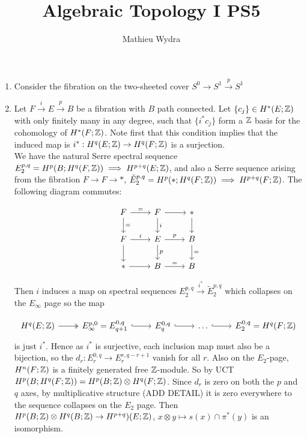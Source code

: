 \documentclass[10pt,a4paper]{article}
\title{Algebraic Topology I PS5}
\author{Mathieu Wydra}
\date{}
\begin{document}
\maketitle
\begin{enumerate}
\item Consider the fibration on the two-sheeted cover $S^0\to S^1\xrightarrow{p} S^1$
\item Let $F\xrightarrow{i }E \xrightarrow{p} B$ be a fibration with $B$ path connected. Let $\{c_j\}\in H^*(E;\mathbb{Z})$ with only finitely many in any degree, such that $\{i^*c_j\}$ form a $\mathbb{Z}$ basis for the cohomology of $H^*(F;\mathbb{Z})$. Note first that this condition implies that the induced map is $i^*:H^q(E;\mathbb{Z})\to H^q(F;\mathbb{Z})$ is a surjection. \\
We have the natural Serre spectral sequence $E^{p,q}_2 = H^p(B;H^q(F,\mathbb{Z}))\implies H^{p+q}(E;\mathbb{Z})$, and also a Serre sequence arising from the fibration $F\to F\to *$, $\tilde{E}^{p,q}_2 = H^p(*; H^q(F;\mathbb{Z}))\implies H^{p+q}(F;\mathbb{Z})$. The following diagram commutes:

\[\begin{tikzcd}
F \arrow[r,"="] \arrow[d,"="] & F\arrow{r}\arrow[d,"i"] & * \arrow{d}\\
F\arrow[r,"i"]\arrow{d} & E\arrow[r,"p"]\arrow[d,"p"]& B\arrow[d,"="]\\
* \arrow{r} & B\arrow[r,"="] & B
\end{tikzcd}\]

Then $i$ induces a map on spectral sequences $E_2^{p,q}\xrightarrow{i^*}\tilde{E}_2^{p,q}$ which collapses on the $E_\infty$ page so the map

\[\begin	{tikzcd}
H^q(E;\Z) \arrow[r,two heads] &E^{p,0}_\infty  = E^{0,q}_{q+1} \arrow[r,hook]& E^{0,q}_q\arrow[r,hook] &\ldots\arrow[r,hook]& E_2^{0,q} = H^q(F;\Z)
\end{tikzcd}\]
is just $i^*$. Hence as $i^*$ is surjective, each inclusion map must also be a bijection, so the $d_r:E^{0,q}_r\to E^{r,q-r+1}_r$ vanish for all $r$. Also on the $E_2$-page, $H^n(F;\mathbb{Z})$ is a finitely generated free $\mathbb{Z}$-module. So by UCT $H^p(B;H^q(F;\mathbb{Z})) = H^p(B;\mathbb{Z})\otimes H^q(F;\mathbb{Z})$. Since $d_r$ is zero on both the $p$ and $q$ axes, by multiplicative structure (ADD DETAIL) it is zero everywhere to the sequence collapses on the $E_2$ page. Then $H^p(B;\mathbb{Z})\otimes H^q(B;\mathbb{Z})\to H^{p+q})(E;\mathbb{Z})$, $x\otimes y\mapsto s(x)\cap \pi^*(y)$ is an isomorphism.
\end{enumerate}
\end{document}
